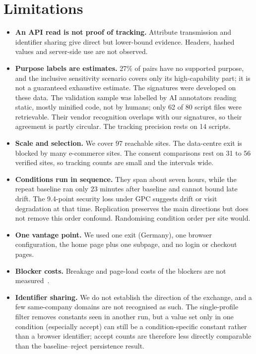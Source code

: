 \documentclass[sigconf,review,anonymous]{acmart}
\begin{document}
\section{Limitations}
\begin{itemize}
\item \textbf{An API read is not proof of tracking.} Attribute transmission and identifier
  sharing give direct but lower-bound evidence. Headers, hashed values and server-side use are
  not observed.
\item \textbf{Purpose labels are estimates.} 27\% of pairs have no supported purpose, and the
  inclusive sensitivity scenario covers only its high-capability part; it is not a guaranteed
  exhaustive estimate. The signatures were developed on these data. The validation sample was labelled
  by AI annotators reading static, mostly minified code, not by humans; only 62 of 80 script files
  were retrievable. Their vendor recognition overlaps with our signatures, so their agreement is
  partly circular. The tracking precision rests on 14 scripts.
\item \textbf{Scale and selection.} We cover 97 reachable sites. The data-centre exit is blocked
  by many e-commerce sites. The consent comparisons rest on 31 to 56 verified sites, so tracking
  counts are small and the intervals wide.
\item \textbf{Conditions run in sequence.} They span about seven hours, while the repeat baseline
  ran only 23 minutes after baseline and cannot bound late drift. The 9.4-point security loss
  under GPC suggests drift or visit degradation at that time. Replication preserves the main
  directions but does not remove this order confound. Randomising condition order per site would.
\item \textbf{One vantage point.} We used one exit (Germany), one browser configuration, the
  home page plus one subpage, and no login or checkout pages.
\item \textbf{Blocker costs.} Breakage and page-load costs of the blockers are not
  measured~\cite{amjad2023blocking}.
\item \textbf{Identifier sharing.} We do not establish the direction of the exchange, and a few
  same-company domains are not recognised as such. The single-profile filter removes constants
  seen in another run, but a value set only in one condition (especially accept) can still be a
  condition-specific constant rather than a browser identifier; accept counts are therefore less
  directly comparable than the baseline--reject persistence result.
\end{itemize}
\end{document}
